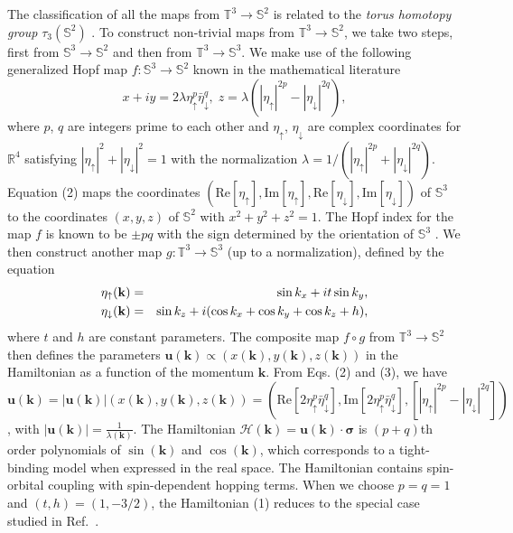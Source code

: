 \documentclass[twocolumn,prb,aps,epsfig,superscriptaddress,showpacs]{revtex4-1}
\begin{document}
The classification of all the maps from $\mathbb{T}^{3}\rightarrow \mathbb{S}%
^{2}$ is related to the \textit{torus homotopy group} $\tau _{3}(\mathbb{S}%
^{2})$ \cite{1948Fox}. To construct non-trivial maps from $\mathbb{T}%
^{3}\rightarrow \mathbb{S}^{2}$, we take two steps, first from $\mathbb{S}%
^{3}\rightarrow \mathbb{S}^{2}$ and then from $\mathbb{T}^{3}\rightarrow
\mathbb{S}^{3}$. We make use of the following generalized Hopf map $f:%
\mathbb{S}^{3}\rightarrow \mathbb{S}^{2}$ known in the mathematical
literature \cite{1947Whitehead}
\begin{equation}
x+iy=2\lambda \eta _{\uparrow }^{p}\bar{\eta}_{\downarrow }^{q},\;z=\lambda
(|\eta _{\uparrow }|^{2p}-|\eta _{\downarrow }|^{2q}),  \label{eq:HopfMap}
\end{equation}%
where $p$, $q$ are integers prime to each other and $\eta _{\uparrow }$, $%
\eta _{\downarrow }$ are complex coordinates for $\mathbb{R}^{4}$ satisfying
$|\eta _{\uparrow }|^{2}+|\eta _{\downarrow }|^{2}=1$ with the normalization
$\lambda =1/(|\eta _{\uparrow }|^{2p}+|\eta _{\downarrow }|^{2q})$. Equation
(2) maps the coordinates $\left( \text{Re}[\eta _{\uparrow }],\text{Im}[\eta
_{\uparrow }],\text{Re}[\eta _{\downarrow }],\text{Im}[\eta _{\downarrow
}]\right) $ of $\mathbb{S}^{3}$ to the coordinates $(x,y,z)$ of $\mathbb{S}%
^{2}$ with $x^{2}+y^{2}+z^{2}=1$. The Hopf index for the map $f$ is known to
be $\pm pq$ with the sign determined by the orientation of $\mathbb{S}^{3}$
\cite{1947Whitehead}. We then construct another map $g:\mathbb{T}%
^{3}\rightarrow \mathbb{S}^{3}$ (up to a normalization), defined by the equation
\begin{eqnarray}
\eta _{\uparrow }\mathbf{(k)} &=&\sin k_{x}+it\sin k_{y},  \notag \\
\eta _{\downarrow }\mathbf{(k)} &=&\sin k_{z}+i(\cos k_{x}+\cos k_{y}+\cos
k_{z}+h),  \label{eq:TorusToS3}
\end{eqnarray}%
where $t$ and $h$ are constant parameters. The composite map $f\circ g$ from
$\mathbb{T}^{3}\rightarrow \mathbb{S}^{2}$ then defines the parameters $%
\mathbf{u(k)}\propto (x\mathbf{(k)},y\mathbf{(k)},z\mathbf{(k)})$ in the
Hamiltonian as a function of the momentum $\mathbf{k}$. From Eqs. (2) and
(3), we have $\mathbf{u(k)}=|\mathbf{u(k)}|(x\mathbf{(k)},y\mathbf{(k)},z%
\mathbf{(k)})=(\text{Re}[2\eta _{\uparrow }^{p}\bar{\eta}_{\downarrow }^{q}],%
\text{Im}[2\eta _{\uparrow }^{p}\bar{\eta}_{\downarrow }^{q}],[|\eta
_{\uparrow }|^{2p}-|\eta _{\downarrow }|^{2q}])$, with $|\mathbf{u(k)}|=%
\frac{1}{\lambda \mathbf{(k)}}$. The Hamiltonian $\mathcal{H}(\mathbf{k})=%
\mathbf{u}(\mathbf{k})\cdot \boldsymbol{\sigma }$ is $\left( p+q\right) $th
order polynomials of $\sin \left( \mathbf{k}\right) $ and $\cos \left(
\mathbf{k}\right) $, which corresponds to a tight-binding model when
expressed in the real space. The Hamiltonian contains spin-orbital coupling
with spin-dependent hopping terms. When we choose $p=q=1$ and $(t,h)=(1,-3/2)
$, the Hamiltonian (1) reduces to the special case studied in Ref.\ \cite%
{2008Moore}.
\end{document}
